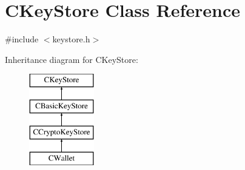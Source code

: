 \hypertarget{class_c_key_store}{}\section{C\+Key\+Store Class Reference}
\label{class_c_key_store}


{\ttfamily \#include $<$keystore.\+h$>$}

Inheritance diagram for C\+Key\+Store\+:\begin{figure}[H]
\begin{center}
\leavevmode
\includegraphics[height=4.000000cm]{class_c_key_store}
\end{center}
\end{figure}
